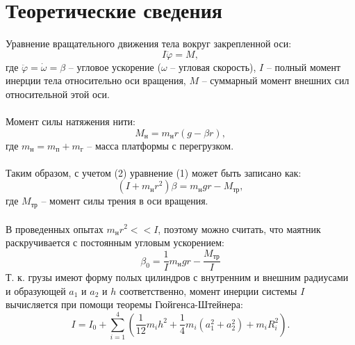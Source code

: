 \documentclass[a4paper]{article}
\begin{document}
\section{Теоретические сведения}
Уравнение вращательного движения тела вокруг закрепленной оси:
\begin{equation}
I\ddot{\varphi} = M,
\end{equation} где $\ddot{\varphi} = \dot{\omega} = \beta$ -- угловое ускорение ($\omega$ -- угловая скорость), $I$ -- полный
момент инерции тела относительно оси вращения, $M$ -- суммарный момент внешних сил относительной этой оси. \\ \\
Момент силы натяжения нити:
\begin{equation}
M_\text{н} = m_\text{н}r(g-\beta r),    
\end{equation}
где  $m_\text{н} = m_\text{п} + m_\text{г}$ -- масса платформы с перегрузком. \\ \\
Таким образом, с учетом (2) уравнение (1) может быть записано как:
\begin{equation}
(I + m_\text{н}r^2)\beta = m_\text{н}gr - M_\text{тр},
\end{equation} где $M_\text{тр}$ --  момент силы трения в оси вращения. \\ \\
В проведенных опытах $m_\text{н} r^2 << I$,  поэтому можно считать, что маятник раскручивается с постоянным угловым ускорением:
\begin{equation}
    \beta_0 = \frac{1}{I}m_\text{н}gr - \frac{M_{\text{тр}}}{I}
    \label{eq:beta_0}
\end{equation}
Т. к. грузы имеют форму полых цилиндров с внутренним и внешним радиусами и образующей $a_1$ и $a_2$ и  $h$ соответственно, момент инерции системы $I$ вычисляется при помощи теоремы Гюйгенса-Штейнера:
\begin{equation}
    I = I_0 + \sum_{i=1}^{4} \left( \frac{1}{12} m_i h^2 + \frac{1}{4} m_i (a_1^2 + a_2^2) + m_i R_i^2 \right).
    \label{eq:moment_of_inertia}
\end{equation}
\end{document}
